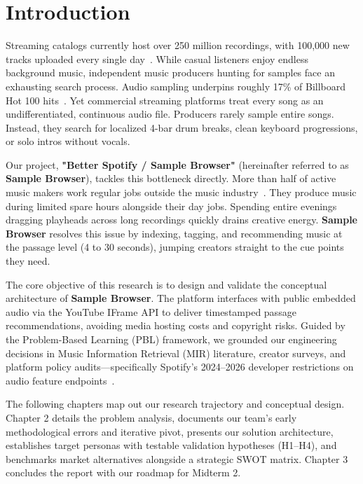 \chapter{Introduction}

Streaming catalogs currently host over 250 million recordings, with 100,000 new tracks uploaded every single day~\cite{ref:ifpi2026}. While casual listeners enjoy endless background music, independent music producers hunting for samples face an exhausting search process. Audio sampling underpins roughly 17\% of Billboard Hot 100 hits~\cite{ref:tracklib2022}. Yet commercial streaming platforms treat every song as an undifferentiated, continuous audio file. Producers rarely sample entire songs. Instead, they search for localized 4-bar drum breaks, clean keyboard progressions, or solo intros without vocals. 

Our project, \textbf{"Better Spotify / Sample Browser"} (hereinafter referred to as \textbf{Sample Browser}), tackles this bottleneck directly. More than half of active music makers work regular jobs outside the music industry~\cite{ref:ukcensus2023}. They produce music during limited spare hours alongside their day jobs. Spending entire evenings dragging playheads across long recordings quickly drains creative energy. \textbf{Sample Browser} resolves this issue by indexing, tagging, and recommending music at the passage level (4 to 30 seconds), jumping creators straight to the cue points they need.

The core objective of this research is to design and validate the conceptual architecture of \textbf{Sample Browser}. The platform interfaces with public embedded audio via the YouTube IFrame API to deliver timestamped passage recommendations, avoiding media hosting costs and copyright risks. Guided by the Problem-Based Learning (PBL) framework, we grounded our engineering decisions in Music Information Retrieval (MIR) literature, creator surveys, and platform policy audits---specifically Spotify's 2024--2026 developer restrictions on audio feature endpoints~\cite{ref:spotifydev2024, ref:spotifydev2026}.

The following chapters map out our research trajectory and conceptual design. Chapter 2 details the problem analysis, documents our team's early methodological errors and iterative pivot, presents our solution architecture, establishes target personas with testable validation hypotheses (H1--H4), and benchmarks market alternatives alongside a strategic SWOT matrix. Chapter 3 concludes the report with our roadmap for Midterm 2.
